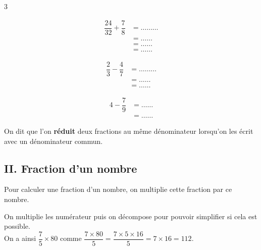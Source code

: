 \begin{Exemples}
{
  \setlength{\columnseprule}{0.4pt} %
  \renewcommand{\columnseprulecolor}{\color{Couleur10}}
\begin{multicols}{3}

\begin{align*}
\dfrac{24}{32} + \dfrac{7}{8} &= \ldots\ldots\ldots \\
&=\ldots\ldots \\[0.7em]
&=\ldots\ldots \\[0.7em]
&= \ldots\ldots
\end{align*}


\columnbreak


\begin{align*}
\dfrac{2}{3} - \dfrac{4}{7} &= \ldots\ldots\ldots \\
&= \ldots\ldots \\[0.7em]
&= \ldots\ldots
\end{align*}

\columnbreak


\begin{align*}
4 - \dfrac{7}{9} &= \ldots\ldots \\
&= \ldots\ldots
\end{align*}

\end{multicols}
}
\end{Exemples}


\vspace{0.3cm}
\begin{Remarque}
On dit que l'on \textbf{réduit} deux fractions au même dénominateur lorsqu'on les écrit avec un dénominateur commun.
\end{Remarque}


\newpage
\subsection*{II. Fraction d'un nombre}

\begin{Propriété}[c]
Pour calculer une fraction d'un nombre, on multiplie cette fraction par ce nombre.
\end{Propriété}

\begin{Méthode}
On multiplie les numérateur puis on décompose pour pouvoir simplifier si cela est possible.\\
On a ainsi $\dfrac{7}{5} \times 80$ comme $\dfrac{7 \times 80}{5} = \dfrac{7 \times 5 \times 16}{5} = 7 \times 16 =112$.
\end{Méthode}


